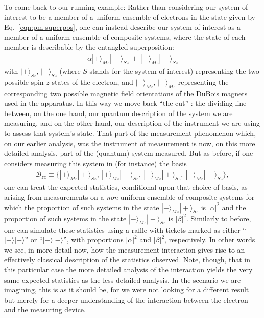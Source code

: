 To come back to our running example: Rather than considering our system of interest to be a member of a uniform ensemble of electrons in the state given by Eq.\ \eqref{eqn:pm-superpos}, one can instead describe our system of interest as a member of a uniform ensemble of composite systems, where the state of each member is describable by the entangled superposition:
\begin{align}
  \label{eqn:compound}
  \alpha |+ \rangle_{Mz} |+ \rangle_{Sz} \, + \; |-  \rangle_{Mz} | - \rangle_{Sz}
\end{align}
with $| + \rangle_{Sz}$, $|- \rangle_{Sz}$ (where $S$ stands for the system of interest) representing the two possible spin-$z$ states of the electron, and $| + \rangle_{Mz}$, $| - \rangle_{Mz}$ representing the corresponding two possible magnetic field orientations of the DuBois magnets used in the apparatus. In this way we move back ``the cut'' \citep[see][sec. 10.4]{Bub 2016}: the dividing line between, on the one hand, our quantum description of the system we are measuring, and on the other hand, our description of the instrument we are using to assess that system's state. That part of the measurement phenomenon which, on our earlier analysis, was the instrument of measurement is now, on this more detailed analysis, part of the (quantum) system measured. But as before, if one considers measuring this system in (for instance) the basis
\begin{align}
  \label{eqn:zzbasis}
  \mathcal{B}_{zz} \equiv \{|+\rangle_{Mz}|+\rangle_{Sz},~ |+\rangle_{Mz}|-\rangle_{Sz},~ |-\rangle_{Mz}|+\rangle_{Sz},~ |-\rangle_{Mz}|-\rangle_{Sz}\},
\end{align}
one can treat the expected statistics, conditional upon that choice of basis, as arising from measurements on a \emph{non}-uniform ensemble of composite systems for which the proportion of such systems in the state $| + \rangle_{Mz}| + \rangle_{Sz}$ is $|\alpha|^2$ and the proportion of such systems in the state $| - \rangle_{Mz}| - \rangle_{Sz}$ is $|\beta|^2$. Similarly to before, one can simulate these statistics using a raffle with tickets marked as either ``$|+\rangle|+\rangle$'' or ``$|-\rangle|-\rangle$'', with proportions $|\alpha|^2$ and $|\beta|^2$, respectively. In other words we see, in more detail now, how the measurement interaction gives rise to an effectively classical description of the statistics observed. Note, though, that in this particular case the more detailed analysis of the interaction yields the very same expected statistics as the less detailed analysis. In the scenario we are imagining, this is as it should be, for we were not looking for a different result but merely for a deeper understanding of the interaction between the electron and the measuring device.

